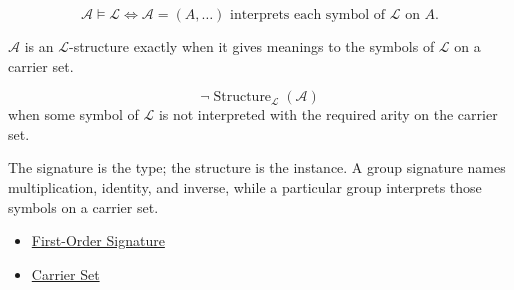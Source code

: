 \begin{remark*}
\[
\mathcal{A}\models\mathcal{L}
\Longleftrightarrow
\mathcal{A}=(A,\ldots)
\text{ interprets each symbol of }\mathcal{L}\text{ on }A.
\]
\end{remark*}

\begin{remark*}
$\mathcal{A}$ is an $\mathcal{L}$-structure exactly when it gives meanings to
the symbols of $\mathcal{L}$ on a carrier set.
\end{remark*}

\begin{remark*}
\[
\neg\operatorname{Structure}_{\mathcal{L}}(\mathcal{A})
\]
when some symbol of $\mathcal{L}$ is not interpreted with the required arity on
the carrier set.
\end{remark*}

\begin{remark*}[Interpretation]
The signature is the type; the structure is the instance.  A group signature
names multiplication, identity, and inverse, while a particular group
interprets those symbols on a carrier set.
\end{remark*}

\begin{dependencies}
\begin{itemize}
  \item \hyperref[def:first-order-signature]{First-Order Signature}
  \item \hyperref[def:carrier-set]{Carrier Set}
\end{itemize}
\end{dependencies}
